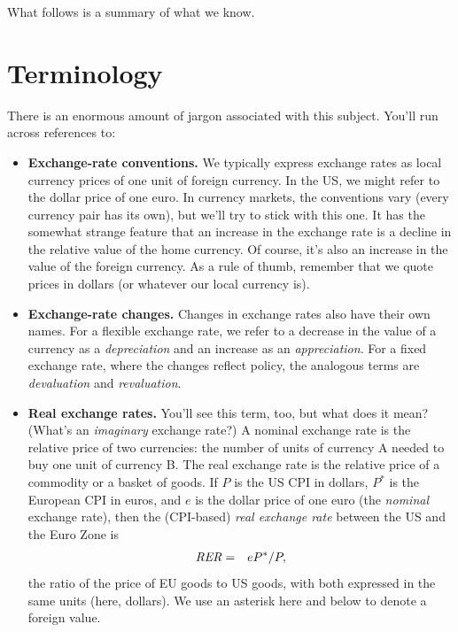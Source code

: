 What follows is a summary of what we know.


\section{Terminology}

There is an enormous amount of jargon associated with this subject.
You'll run across references to:
%
\begin{itemize}

\item \textbf{Exchange-rate conventions.}
We typically express exchange rates as local currency prices of
one unit of foreign currency.
In the US, we might refer to the dollar price of one euro.
In currency markets, the conventions vary
(every currency pair has its own),
but we'll try to stick with this one.
It has the somewhat strange feature that
an increase in the exchange rate is a decline in the relative value of the home currency.
Of course, it's also an increase in the value of the foreign currency.
As a rule of thumb, remember that we quote prices in dollars
(or whatever our local currency is).

\item \textbf{Exchange-rate changes.}
Changes in exchange rates also have their own names.
For a flexible exchange rate,
we refer to a decrease in the value of a currency as a
{\it depreciation\/} and an increase as an {\it appreciation\/}.
For a fixed exchange rate, where the changes reflect policy,
the analogous terms are {\it devaluation\/} and {\it revaluation\/}.

\item \textbf{Real exchange rates.}
You'll see this term, too, but what does it mean?
(What's an \emph{imaginary} exchange rate?)
A nominal exchange rate is the relative price of two currencies:
the number of units of currency A needed to buy one unit
of currency B.
The real exchange rate is the relative price of a commodity or
a basket of goods.
If $P$ is the US CPI in dollars, $P^*$ is the European CPI in euros,
and $e$ is the dollar price of one euro (the {\it nominal} exchange rate), then the (CPI-based) {\it real exchange rate\/} between the US and the Euro Zone is
\begin{eqnarray*}
    \mbox{\it RER\/}  &=& e P^* /P ,
\end{eqnarray*}
the ratio of the price of EU goods to US goods,
with both expressed in the same units (here, dollars).
We use an asterisk here and below to denote a foreign value.



\end{itemize}
